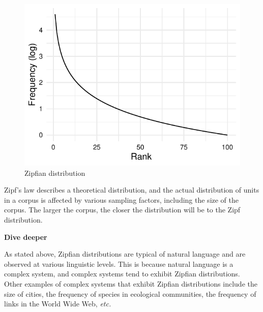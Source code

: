\documentclass[
  letterpaper,
  krantz1]{latex/krantz-mod}
\theoremstyle{definition}
\theoremstyle{definition}
\theoremstyle{remark}
\begin{document}
\begin{figure}[!htb]
\begin{minipage}{0.50\linewidth}
{\includegraphics{part_2/3_analysis_files/figure-pdf/fig-analysis-zipf-distribution-2.pdf}

}


\end{minipage}%

\caption{\label{fig-analysis-zipf-distribution}Zipfian distribution}

\end{figure}%

Zipf's law describes a theoretical distribution, and the actual
distribution of units in a corpus is affected by various sampling
factors, including the size of the corpus. The larger the corpus, the
closer the distribution will be to the Zipf distribution.

\begin{tcolorbox}[enhanced jigsaw, toprule=.15mm, breakable, colback=white, arc=.35mm, left=2mm, colframe=quarto-callout-color-frame, opacityback=0, bottomrule=.15mm, rightrule=.15mm, leftrule=.75mm]

\textbf{ Dive deeper}

As stated above, Zipfian distributions are typical of natural language
and are observed at various linguistic levels. This is because natural
language is a complex system, and complex systems tend to exhibit
Zipfian distributions. Other examples of complex systems that exhibit
Zipfian distributions include the size of cities, the frequency of
species in ecological communities, the frequency of links in the World
Wide Web, \emph{etc.}

\end{tcolorbox}
\end{document}
